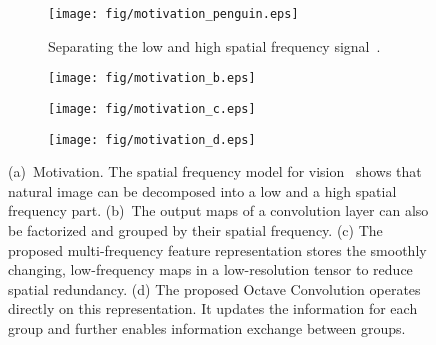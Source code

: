 \documentclass[10pt,twocolumn,letterpaper]{article}
\newcommand{\hiConvName}[0]{Octave Convolution\xspace}
\begin{document}
  
\begin{figure}[t!]
    \begin{subfigure}[b]{0.95\columnwidth}
      \texttt{[image: fig/motivation\_penguin.eps]}
      \caption{Separating the low and high spatial frequency signal~\cite{campbell1968application, spatialvision}.}
      \label{fig:teaser_a}
    \end{subfigure}
    \begin{subfigure}[b]{.3\columnwidth}
      \texttt{[image: fig/motivation\_b.eps]}
      \caption{}
    \end{subfigure}
    \begin{subfigure}[b]{.3\columnwidth}
      \texttt{[image: fig/motivation\_c.eps]}
      \caption{}
    \end{subfigure}
    \begin{subfigure}[b]{.34\columnwidth}
      \texttt{[image: fig/motivation\_d.eps]}
      \caption{}
    \end{subfigure}
    \vspace{-2mm}
    \caption{(a)~Motivation. The spatial frequency model for vision~\cite{campbell1968application, spatialvision} shows that natural image can be decomposed into a low and a high spatial frequency part. (b)~The output maps of a convolution layer can also be factorized and grouped by their spatial frequency. (c) The proposed multi-frequency feature representation stores the smoothly changing, low-frequency maps in a low-resolution tensor to reduce spatial redundancy. (d) The proposed \hiConvName operates directly on this representation. It updates the information for each group and further enables information exchange between groups.}
    \label{fig:motivation}
    \vspace{-5mm}
  \end{figure}
\end{document}
